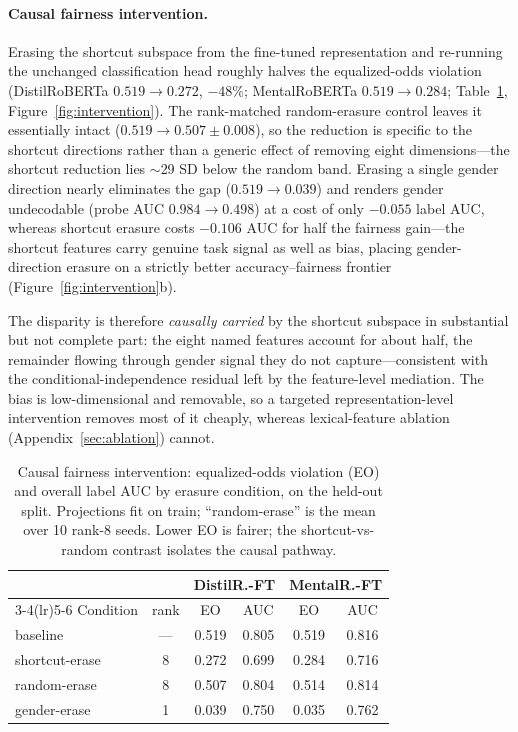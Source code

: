 \documentclass[11pt]{article}
\begin{document}
\paragraph{Causal fairness intervention.}
Erasing the shortcut subspace from the fine-tuned representation and re-running the unchanged classification head roughly halves the equalized-odds violation (DistilRoBERTa $0.519 \to 0.272$, $-48\%$; MentalRoBERTa $0.519 \to 0.284$; Table~\ref{tab:intervention}, Figure~\ref{fig:intervention}). The rank-matched random-erasure control leaves it essentially intact ($0.519 \to 0.507 \pm 0.008$), so the reduction is specific to the shortcut directions rather than a generic effect of removing eight dimensions---the shortcut reduction lies $\sim$29 SD below the random band. Erasing a single gender direction nearly eliminates the gap ($0.519 \to 0.039$) and renders gender undecodable (probe AUC $0.984 \to 0.498$) at a cost of only $-0.055$ label AUC, whereas shortcut erasure costs $-0.106$ AUC for half the fairness gain---the shortcut features carry genuine task signal as well as bias, placing gender-direction erasure on a strictly better accuracy--fairness frontier (Figure~\ref{fig:intervention}b).

The disparity is therefore \emph{causally carried} by the shortcut subspace in substantial but not complete part: the eight named features account for about half, the remainder flowing through gender signal they do not capture---consistent with the conditional-independence residual left by the feature-level mediation. The bias is low-dimensional and removable, so a targeted representation-level intervention removes most of it cheaply, whereas lexical-feature ablation (Appendix~\ref{sec:ablation}) cannot.

\begin{table}[t]
\centering
\small
\caption{Causal fairness intervention: equalized-odds violation (EO) and overall label AUC by erasure condition, on the held-out split. Projections fit on train; ``random-erase'' is the mean over 10 rank-8 seeds. Lower EO is fairer; the shortcut-vs-random contrast isolates the causal pathway.}
\label{tab:intervention}
\begin{tabular}{@{}l c cc cc@{}}
\toprule
& & \multicolumn{2}{c}{\textbf{DistilR.-FT}} & \multicolumn{2}{c}{\textbf{MentalR.-FT}}\\
\cmidrule(lr){3-4}\cmidrule(lr){5-6}
Condition & rank & EO & AUC & EO & AUC\\
\midrule
baseline       & --- & 0.519 & 0.805 & 0.519 & 0.816\\
shortcut-erase & 8   & 0.272 & 0.699 & 0.284 & 0.716\\
random-erase   & 8   & 0.507 & 0.804 & 0.514 & 0.814\\
gender-erase   & 1   & 0.039 & 0.750 & 0.035 & 0.762\\
\bottomrule
\end{tabular}
\end{table}
\end{document}
